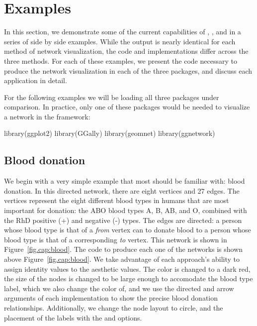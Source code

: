 \section{Examples}
\label{sec:examples}

In this section, we demonstrate some of the current capabilities of , , and  in a series of side by side examples. While the output is nearly identical for each method of network visualization, the code and implementations differ across the three methods. For each of these examples, we present the code necessary to produce the network visualization in each of the three packages, and discuss each application in detail.

For the following examples we will be loading all three packages under comparison. In practice, only one of these packages would be needed to visualize a network in the  framework:
\begin{example}
library(ggplot2)
library(GGally)
library(geomnet)
library(ggnetwork)


\end{example}

\subsection{Blood donation} 

We begin with a very simple example that most should be familiar with: blood donation. In this directed network, there are eight vertices and 27 edges.  The vertices represent the eight different blood types in humans that are most important for donation: the ABO blood types A, B, AB, and O, combined with the RhD positive (+) and negative (-) types. The edges are directed: a person whose blood type is that of a \emph{from} vertex can to donate blood to a person whose blood type is that of a corresponding \emph{to} vertex.  This network is shown in Figure~\ref{fig.cap:blood}. The code to produce each one of the networks is shown above Figure~\ref{fig.cap:blood}. We take advantage of each approach's ability to assign identity values to the aesthetic values. The color is changed to a dark red, the size of the nodes is changed to be large enough to accomodate the blood type label, which we also change the color of, and we use the directed and arrow arguments of each implementation to show the precise blood donation relationships. Additionally, we change the node layout to circle, and the placement of the labels with the  and  options. 

